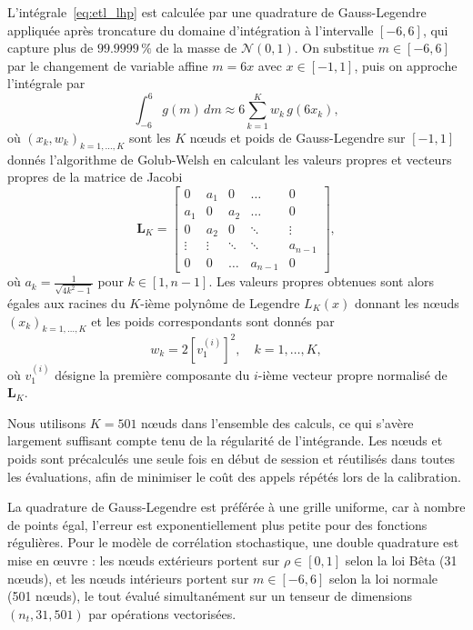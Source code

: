 L'intégrale~\eqref{eq:etl_lhp} est calculée par une quadrature de Gauss-Legendre appliquée
après troncature du domaine d'intégration à l'intervalle $[-6, 6]$, qui capture plus de
$99.9999\,\%$ de la masse de $\mathcal{N}(0,1)$. On substitue $m \in [-6, 6]$ par le changement de
variable affine $m = 6x$ avec $x \in [-1, 1]$, puis on approche l'intégrale par
\begin{equation}
    \int_{-6}^{6} g(m)\, dm \approx 6 \sum_{k=1}^{K} w_k\, g(6 x_k),
\end{equation}
où $(x_k, w_k)_{k=1,\ldots,K}$ sont les $K$ nœuds et poids de Gauss-Legendre sur
$[-1,1]$ donnés l'algorithme de Golub-Welsh en calculant les valeurs propres et vecteurs propres 
de la matrice de Jacobi
\begin{equation}
    \mathbf{L}_K =
    \begin{bmatrix}
        0   & a_1 & 0   & \dots  & 0      \\
        a_1 & 0   & a_2 & \dots  & 0      \\
        0   & a_2 & 0   & \ddots & \vdots \\
        \vdots  & \vdots & \ddots   & \ddots & a_{n-1} \\
        0  & 0 & \dots   & a_{n-1} & 0
    \end{bmatrix},
\end{equation}
où $a_k = \frac{1}{\sqrt{4k^2-1}}$ pour $k\in[1, n-1]$. Les valeurs propres obtenues sont alors
égales aux racines du $K$-ième polynôme de Legendre $L_K(x)$ donnant les nœuds $(x_k)_{k=1,\ldots,K}$
et les poids correspondants sont donnés par
\begin{equation}
    w_k = 2\left[v^{(i)}_1\right]^2 , \quad k=1,\ldots,K,
\end{equation}
où $v^(i)_1$ désigne la première composante du $i$-ième vecteur propre normalisé de $\mathbf{L}_K$.

Nous utilisons $K = 501$ nœuds dans l'ensemble des calculs, ce qui s'avère
largement suffisant compte tenu de la régularité de l'intégrande. Les nœuds et poids sont
précalculés une seule fois en début de session et réutilisés dans toutes les évaluations, afin
de minimiser le coût des appels répétés lors de la calibration.

La quadrature de Gauss-Legendre est préférée à une grille uniforme, car à nombre de points
égal, l'erreur est exponentiellement plus petite pour des fonctions régulières. Pour le modèle
de corrélation stochastique, une double quadrature est mise en œuvre : les nœuds extérieurs
portent sur $\rho \in [0,1]$ selon la loi Bêta (31 nœuds), et les nœuds intérieurs portent sur
$m \in [-6,6]$ selon la loi normale (501 nœuds), le tout évalué simultanément sur un tenseur
de dimensions $(n_t, 31, 501)$ par opérations vectorisées.

